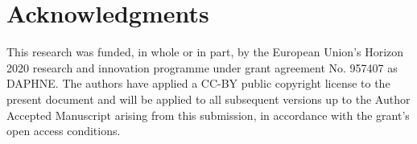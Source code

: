 \documentclass[sigconf,natbib=false]{acmart}
\newcommand{\eg}{\emph{e.g.,}}
\newcommand{\aeval}{Artifact Evaluation}
\newcommand{\todo}[1]{{\color{red}{TODO: #1}}}
\begin{document}
% 
% 
% 
% 

\section*{Acknowledgments}

This research was funded, in whole or in part, by the European Union’s Horizon 2020 research and innovation programme under grant agreement No. 957407 as DAPHNE.
The authors have applied a CC-BY public copyright license to the present document and will be applied to all subsequent versions up to the Author Accepted Manuscript arising from this submission, in accordance with the grant’s open access conditions.


%
%
\printbibliography
\end{document}
